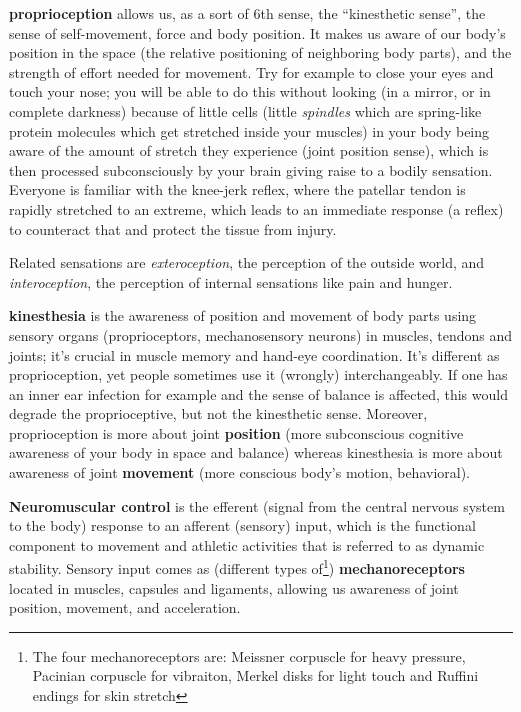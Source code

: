 \textbf{\Gls{proprioception}} allows us, as a sort of 6th sense, the ``kinesthetic sense'', the sense of self-movement, force and body position.
It makes us aware of our body's position in the space (the relative positioning of neighboring body parts), and the strength of effort needed for movement.
Try for example to close your eyes and touch your nose; you will be able to do this without looking (in a mirror, or in complete darkness) because of little cells (little \textit{spindles} which are spring-like protein molecules which get stretched inside your muscles) in your body being aware of the amount of stretch they experience (joint position sense), which is then processed subconsciously by your brain giving raise to a bodily sensation.
Everyone is familiar with the knee-jerk reflex, where the patellar tendon is rapidly stretched to an extreme, which leads to an immediate response (a reflex) to counteract that and protect the tissue from injury.

Related sensations are \textit{exteroception}, the perception of the outside world, and \textit{interoception}, the perception of internal sensations like pain and hunger.

\textbf{\Gls{kinesthesia}} is the awareness of position and movement of body parts using sensory organs (proprioceptors, mechanosensory neurons) in muscles, tendons and joints; it's crucial in muscle memory and hand-eye coordination.
It's different as proprioception, yet people sometimes use it (wrongly) interchangeably.
If one has an inner ear infection for example and the sense of balance is affected, this would degrade the proprioceptive, but not the kinesthetic sense.
Moreover, proprioception is more about joint \textbf{position} (more subconscious cognitive awareness of your body in space and balance) whereas kinesthesia is more about awareness of joint \textbf{movement} (more conscious body's motion, behavioral).

\textbf{Neuromuscular control} is the efferent (signal from the central nervous system to the body) response to an afferent (sensory) input, which is the functional component to movement and athletic activities that is referred to as dynamic stability.
Sensory input comes as (different types of\footnote{The four mechanoreceptors are: Meissner corpuscle for heavy pressure, Pacinian corpuscle for vibraiton, Merkel disks for light touch and Ruffini endings for skin stretch}) \textbf{mechanoreceptors} located in muscles, capsules and ligaments, allowing us awareness of joint position, movement, and acceleration.

